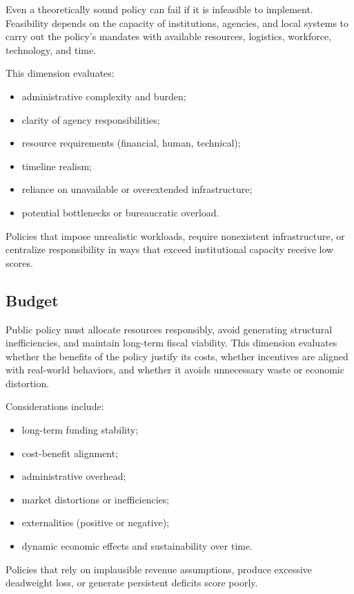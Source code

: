 \documentclass[12pt]{article}
\begin{document}
Even a theoretically sound policy can fail if it is infeasible to implement. Feasibility depends on the capacity of
institutions, agencies, and local systems to carry out the policy's mandates with available resources, logistics, workforce,
technology, and time.

This dimension evaluates:
\begin{itemize}
    \item administrative complexity and burden;
    \item clarity of agency responsibilities;
    \item resource requirements (financial, human, technical);
    \item timeline realism;
    \item reliance on unavailable or overextended infrastructure;
    \item potential bottlenecks or bureaucratic overload.
\end{itemize}

Policies that impose unrealistic workloads, require nonexistent infrastructure, or centralize responsibility in ways that
exceed institutional capacity receive low scores.

\subsection{Budget}

Public policy must allocate resources responsibly, avoid generating structural inefficiencies, and maintain long-term fiscal
viability. This dimension evaluates whether the benefits of the policy justify its costs, whether incentives are aligned
with real-world behaviors, and whether it avoids unnecessary waste or economic distortion.

Considerations include:
\begin{itemize}
    \item long-term funding stability;
    \item cost-benefit alignment;
    \item administrative overhead;
    \item market distortions or inefficiencies;
    \item externalities (positive or negative);
    \item dynamic economic effects and sustainability over time.
\end{itemize}

Policies that rely on implausible revenue assumptions, produce excessive deadweight loss, or generate persistent deficits
score poorly.
\end{document}
